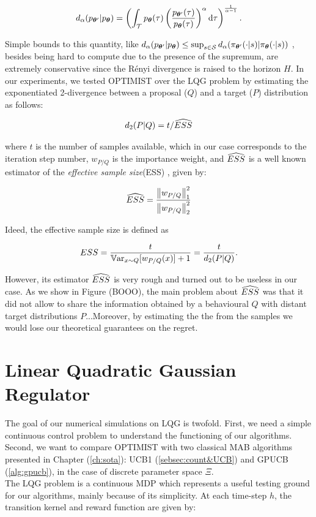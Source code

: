\begin{align}
	d_{\alpha}(p_{\vtheta'}|p_{\vtheta}) = \left(\int_{\Tau}p_{\vtheta}(\tau)\left(\frac{p_{\vtheta'}(\tau)}{p_{\vtheta}(\tau)}\right)^{\alpha}\de \tau\right)^{\frac{1}{\alpha-1}}.
\end{align}

Simple bounds to this quantity, like $d_{\alpha}(p_{\vtheta'}|p_{\vtheta})\leq\sup_{s\in\Sspace}d_{\alpha}(\pi_{\vtheta'}(\cdot|s)|\pi_{\vtheta}(\cdot|s))$ , besides being hard to compute due to the presence of the supremum, are extremely conservative since the Rényi divergence is raised to the horizon $H$. In our experiments, we tested \gls{OPTIMIST} over the \gls{LQG} problem by estimating the exponentiated 2-\Renyi divergence between a proposal ($Q$) and a target ($P$) distribution as follows:

\begin{align}
d_{2}(P|Q)=t / \wh{ESS}
\end{align}

where $t$ is the number of samples available, which in our case corresponds to the iteration step number, $w_{P/Q}$ is the importance weight, and $\wh{ESS}$ \cite{martino2017effective} is a well known estimator of the \emph{effective sample size}(ESS) \cite{kong1992note}, given by:

\begin{align}
\wh{ESS} = \frac{\norm[1]{w_{P/Q}}^2}{\norm[2]{w_{P/Q}}^2}
\end{align}

Ideed, the effective sample size is defined as \cite{kong1992note}

\begin{align}
ESS = \frac{t}{\Var_{x\sim Q}[w_{P/Q}(x)]+1}=\frac{t}{d_{2}(P|Q)}.
\end{align}

However, its estimator $\wh{ESS}$ is very rough and turned out to be useless in our case. As we show in Figure (BOOO), the main problem about $\wh{ESS}$ was that  it did not allow to share the information obtained by a behavioural $Q$ with distant target distributions $P$...Moreover, by estimating the the \Renyi from the samples we would lose our theoretical guarantees on the regret.

\section{Linear Quadratic Gaussian Regulator}
The goal of our numerical simulations on \gls{LQG} is twofold. First, we need a simple continuous control problem to understand the functioning of our algorithms. Second, we want to compare \gls{OPTIMIST} with two classical \gls{MAB} algorithms presented in Chapter (\ref{ch:sota}): \gls{UCB}1 (\ref{sebsec:count&UCB}) and \gls{GPUCB} (\ref{alg:gpucb}), in the case of discrete parameter space $\Xi$.\\
The \gls{LQG} problem \cite{peters2008reinforcement} is a continuous \gls{MDP} which represents a useful testing ground for our algorithms, mainly because of its simplicity. At each time-step $h$, the transition kernel and reward function are given by:

